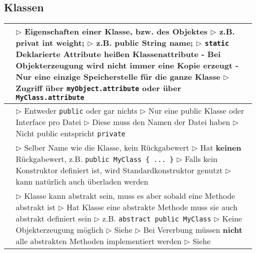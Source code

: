 \subsection{Klassen}
	\begin{table}[H]
	\label{Klassen}
	\begin{tabular}{ | p{4cm} p{13.5cm} | }


	\hline
	\makecell[l]{Attribute} & 
	\makecell[l]
	{
	$\rhd$ Eigenschaften einer Klasse, bzw. des Objektes \\
	$\rhd$ z.B. privat int weight; \\
	$\rhd$ z.B. public String name; \\
	$\rhd$ \texttt{static} Deklarierte Attribute hei\ss en Klassenattribute \\
	\hspace{0.4cm} - Bei Objekterzeugung wird nicht immer eine Kopie erzeugt \\
	\hspace{0.4cm} - Nur eine einzige Speicherstelle für die ganze Klasse \\
	$\rhd$ Zugriff über \texttt{myObject.attribute} oder über \texttt{MyClass.attribute} \\
	} 	\\ \hline

	\makecell[l]{Sichtbarkeit} & 
	\makecell[l]
	{
	$\rhd$ Entweder \texttt{public} oder gar nichts \\
	$\rhd$ Nur eine public Klasse oder Interface pro Datei \\
	$\rhd$ Diese muss den Namen der Datei haben \\
	$\rhd$ Nicht public entspricht \texttt{private}
	} 	\\ \hline
	
	\makecell[l]{Kontruktor} & 
	\makecell[l]
	{
	$\rhd$ Selber Name wie die Klasse, kein Rückgabewert \\
	$\rhd$ Hat \textbf{keinen} Rückgabewert, z.B. \texttt{public 
	MyClass \{ ... \}} \\
	$\rhd$ Falls kein Konstruktor definiert ist, wird Standardkonstruktor genutzt \\
	$\rhd$ kann natürlich auch überladen werden
	} 	\\ \hline
	
	\makecell[l]{Abtraktion} & 
	\makecell[l]
	{
	$\rhd$ Klasse kann abstrakt sein, muss es aber sobald eine 
	Methode abstrakt ist \\
	$\rhd$ Hat Klasse eine abstrakte Methode muss sie auch abstrakt 
	definiert sein \\
	$\rhd$ z.B. \texttt{abstract public MyClass} \\
	$\rhd$ Keine Objekterzeugung möglich \\
	$\rhd$ Siehe \underline{\nameref{Methoden}} \\
	$\rhd$ Bei Vererbung müssen \textbf{nicht} alle abstrakten Methoden 
	implementiert werden \\
	$\rhd$ Siehe \underline{\nameref{Vererbung}}
	} 	\\ \hline


\end{tabular}
\end{table}
